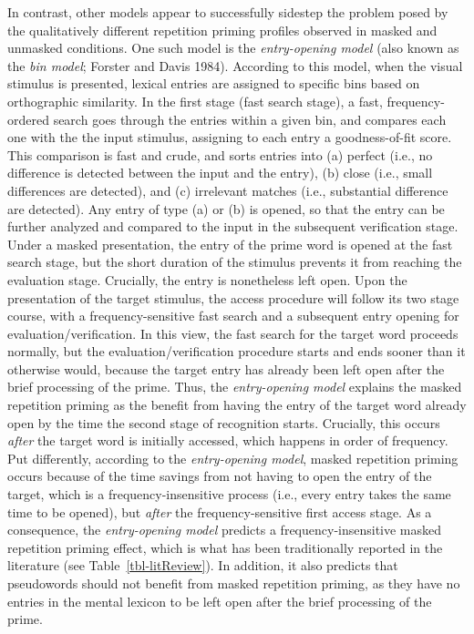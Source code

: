 \documentclass[
]{interact}
\begin{document}
In contrast, other models appear to successfully sidestep the problem
posed by the qualitatively different repetition priming profiles
observed in masked and unmasked conditions. One such model is the
\emph{entry-opening model} (also known as the \emph{bin model}; Forster
and Davis 1984). According to this model, when the visual stimulus is
presented, lexical entries are assigned to specific bins based on
orthographic similarity. In the first stage (fast search stage), a fast,
frequency-ordered search goes through the entries within a given bin,
and compares each one with the the input stimulus, assigning to each
entry a goodness-of-fit score. This comparison is fast and crude, and
sorts entries into (a) perfect (i.e., no difference is detected between
the input and the entry), (b) close (i.e., small differences are
detected), and (c) irrelevant matches (i.e., substantial difference are
detected). Any entry of type (a) or (b) is opened, so that the entry can
be further analyzed and compared to the input in the subsequent
verification stage. Under a masked presentation, the entry of the prime
word is opened at the fast search stage, but the short duration of the
stimulus prevents it from reaching the evaluation stage. Crucially, the
entry is nonetheless left open. Upon the presentation of the target
stimulus, the access procedure will follow its two stage course, with a
frequency-sensitive fast search and a subsequent entry opening for
evaluation/verification. In this view, the fast search for the target
word proceeds normally, but the evaluation/verification procedure starts
and ends sooner than it otherwise would, because the target entry has
already been left open after the brief processing of the prime. Thus,
the \emph{entry-opening model} explains the masked repetition priming as
the benefit from having the entry of the target word already open by the
time the second stage of recognition starts. Crucially, this occurs
\emph{after} the target word is initially accessed, which happens in
order of frequency. Put differently, according to the
\emph{entry-opening model}, masked repetition priming occurs because of
the time savings from not having to open the entry of the target, which
is a frequency-insensitive process (i.e., every entry takes the same
time to be opened), but \emph{after} the frequency-sensitive first
access stage. As a consequence, the \emph{entry-opening model} predicts
a frequency-insensitive masked repetition priming effect, which is what
has been traditionally reported in the literature (see
Table~\ref{tbl-litReview}). In addition, it also predicts that
pseudowords should not benefit from masked repetition priming, as they
have no entries in the mental lexicon to be left open after the brief
processing of the prime.
\end{document}
